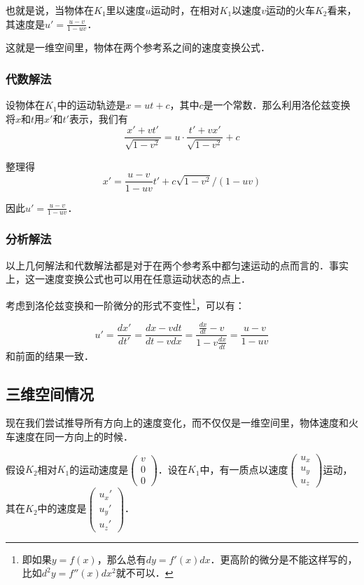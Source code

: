 也就是说，当物体在$K_1$里以速度$u$运动时，在相对$K_1$以速度$v$运动的火车$K_2$看来，其速度是$u'=\frac{u-v}{1-uv}$．

这就是一维空间里，物体在两个参考系之间的速度变换公式．

\subsubsection{代数解法}

设物体在$K_1$中的运动轨迹是$x=ut+c$，其中$c$是一个常数．那么利用洛伦兹变换将$x$和$t$用$x'$和$t'$表示，我们有$$\frac{x'+vt'}{\sqrt{1-v^2}}=u\cdot\frac{t'+vx'}{\sqrt{1-v^2}}+c$$

整理得$$x'=\frac{u-v}{1-uv}t'+c\sqrt{1-v^2}/(1-uv)$$

因此$u'=\frac{u-v}{1-uv}$．

\subsubsection{分析解法}

以上几何解法和代数解法都是对于在两个参考系中都匀速运动的点而言的．事实上，这一速度变换公式也可以用在任意运动状态的点上．

考虑到洛伦兹变换和一阶微分的形式不变性\footnote{即如果$y=f(x)$，那么总有$dy=f'(x)dx$．更高阶的微分是不能这样写的，比如$d^2y=f''(x)dx^2$就不可以．}，可以有：

$$u'=\frac{dx'}{dt'}=\frac{dx-vdt}{dt-vdx}=\frac{\frac{dx}{dt}-v}{1-v\frac{dx}{dt}}=\frac{u-v}{1-uv}$$和前面的结果一致．


\subsection{三维空间情况}

现在我们尝试推导所有方向上的速度变化，而不仅仅是一维空间里，物体速度和火车速度在同一方向上的时候．

假设$K_2$相对$K_1$的运动速度是$\left(\begin{matrix}v\\0\\0\end{matrix} \right) $．设在$K_1$中，有一质点以速度$\left(\begin{matrix}u_x\\u_y\\u_z\end{matrix} \right) \tag{2}$运动，其在$K_2$中的速度是$\left(\begin{matrix}u_x'\\u_y'\\u_z'\end{matrix} \right) $．

